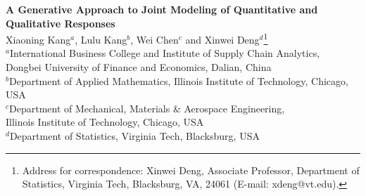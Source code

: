 \documentclass[12pt]{article}
\begin{document}
\begin{center}
{\Large \bf A Generative Approach to Joint Modeling of Quantitative and Qualitative Responses}\\
Xiaoning Kang$^a$, Lulu Kang$^b$, Wei Chen$^c$ and Xinwei Deng$^d$\footnote{Address for correspondence: Xinwei Deng, Associate Professor, Department of Statistics, Virginia Tech, Blacksburg, VA, 24061 (E-mail: xdeng@vt.edu).} \\
\vskip 5pt
{$^a$International Business College and Institute of Supply Chain Analytics, \\
Dongbei University of Finance and Economics, Dalian, China} \\
{$^b$Department of Applied Mathematics, Illinois Institute of Technology, Chicago, USA} \\
{$^c$Department of Mechanical, Materials \& Aerospace Engineering, \\
Illinois Institute of Technology, Chicago, USA}\\
$^d$Department of Statistics, Virginia Tech, Blacksburg, USA
\end{center}

\begin{abstract}
In many scientific areas, data with quantitative and qualitative (QQ) responses are commonly encountered with a large number of predictors.
By exploring the association between QQ responses, existing approaches often consider a joint model of QQ responses given the predictor variables.
However, the dependency among predictive variables also provides useful information for modeling QQ responses.
In this work, we propose a generative approach to model the joint distribution of the QQ responses and predictors.
The proposed generative model provides efficient parameter estimation under a penalized likelihood framework.
It achieves accurate classification for qualitative response and accurate prediction for quantitative response with efficient computation.
Because of the generative approach framework, the asymptotic optimality of classification and prediction of the proposed method can be established under some regularity conditions.
The performance of the proposed method is examined through simulations and real case studies in material science and genetics.
\end{abstract}
\end{document}
